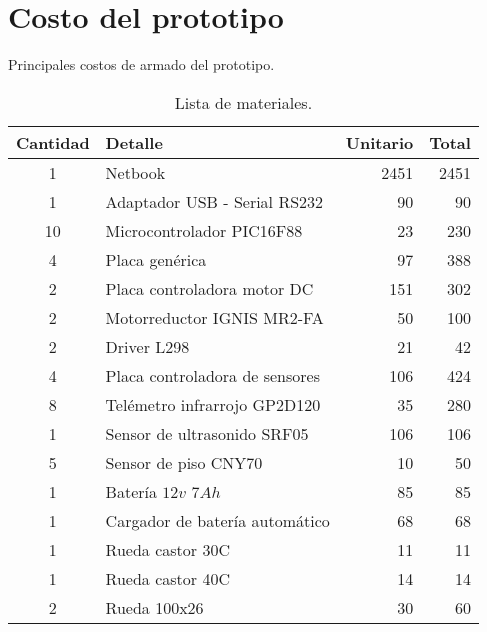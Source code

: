 \section{Costo del prototipo}
\label{hA_costo}

Principales costos de armado del prototipo.

\begin{table}[h]
	\begin{center}
		\begin{tabular}{|c|l|r|r|}
			\hline
			Cantidad & Detalle & Unitario  & Total \\
			\hline
			1 & Netbook & 2451 & 2451 \\
			\hline
			1 & Adaptador USB - Serial RS232 & 90 & 90 \\
			\hline
			10 & Microcontrolador PIC16F88 & 23 & 230 \\
			\hline
			4 & Placa gen\'erica & 97 & 388 \\
			\hline
			2 & Placa controladora motor DC & 151 & 302 \\
			\hline
			2 & Motorreductor IGNIS MR2-FA & 50 & 100 \\
			\hline
			2 & Driver L298 & 21 & 42 \\
			\hline
			4 & Placa controladora de sensores & 106 & 424 \\
			\hline
			8 & Tel\'emetro infrarrojo GP2D120 & 35 & 280 \\
			\hline
			1 & Sensor de ultrasonido SRF05 & 106 & 106 \\
			\hline
			5 & Sensor de piso CNY70 & 10 & 50 \\
			\hline
			1 & Bater\'ia $12v$ $7Ah$  & 85 & 85 \\
			\hline
			1 & Cargador de bater\'ia autom\'atico & 68 & 68 \\
			\hline
			1 & Rueda castor 30C & 11 & 11 \\
			\hline
			1 & Rueda castor 40C & 14 & 14 \\
			\hline
			2 & Rueda 100x26 & 30 & 60 \\
			\hline
		\end{tabular}
	\end{center}
	\caption{Lista de materiales.}
	\label{hT_motorDC}
\end{table}